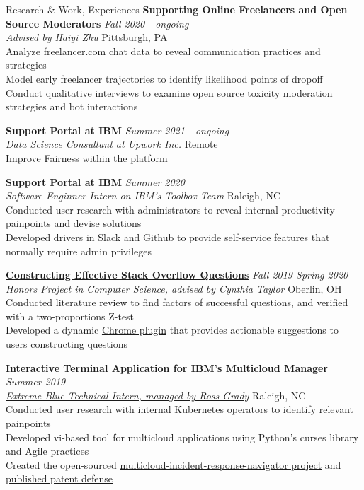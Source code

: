 \documentclass{resume}
\begin{document}
\begin{rSection}{Research \& Work, Experiences}
{\bf Supporting Online Freelancers and Open Source Moderators} \hfill  {\em Fall 2020 - ongoing} \\
{\it Advised by Haiyi Zhu} \hfill { Pittsburgh, PA} \\
{Analyze freelancer.com chat data to reveal communication practices and strategies} \\
{Model early freelancer trajectories to identify likelihood points of dropoff} \\
{Conduct qualitative interviews to examine open source toxicity moderation strategies and bot interactions}

{\bf Support Portal at IBM} \hfill  {\em Summer 2021 - ongoing} \\
{\it Data Science Consultant at Upwork Inc.} \hfill {Remote} \\
{Improve Fairness within the platform} 

{\bf Support Portal at IBM} \hfill  {\em Summer 2020} \\
{\it Software Enginner Intern on IBM's Toolbox Team} \hfill { Raleigh, NC} \\
{Conducted user research with administrators to reveal internal productivity painpoints and devise solutions} \\
{Developed drivers in Slack and Github to provide self-service features that normally require admin privileges}

\href{https://digitalcommons.oberlin.edu/cgi/viewcontent.cgi?article=1693&context=honors}{\bf Constructing Effective Stack Overflow Questions} \hfill  {\em Fall 2019-Spring 2020} \\
{\it Honors Project in Computer Science, advised by Cynthia Taylor} \hfill { Oberlin, OH} \\
{Conducted literature review to find factors of successful questions, and verified with a two-proportions Z-test} \\
{Developed a dynamic \href{https://github.com/janeon/honors-plugin}{Chrome plugin} that provides actionable suggestions to users constructing questions}

\href{https://github.com/IBM/multicloud-incident-response-navigator}{\bf Interactive Terminal Application for IBM's Multicloud Manager} \hfill  {\em Summer 2019} \\
\href{https://www.ibm.com/employment/extremeblue/index.html}{\em Extreme Blue Technical Intern, managed by Ross Grady} \hfill { Raleigh, NC} \\
{Conducted user research with internal Kubernetes operators to identify relevant painpoints} \\
Developed vi-based tool for multicloud applications using Python's curses library and Agile practices \\
{Created the open-sourced \href{https://github.com/IBM/multicloud-incident-response-navigator}{multicloud-incident-response-navigator project}} and \href{https://priorart.ip.com/IPCOM/000262660}{published patent defense}


\end{rSection}
\end{document}
